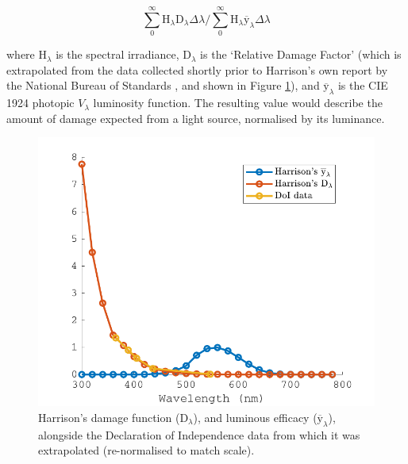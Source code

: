 \begin{equation}
    \sum_{0}^{\infty} \mathrm{H}_{\lambda} \mathrm{D}_{\lambda} \Delta \lambda / \sum_{0}^{\infty} \mathrm{H}_{\lambda} \overline{\mathrm{y}}_{\lambda} \Delta \lambda
    \label{eq:Harrison}
\end{equation}

where $\mathrm{H}_{\lambda}$ is the spectral irradiance, $\mathrm{D}_{\lambda}$ is the `Relative Damage Factor' (which is extrapolated from the data collected shortly prior to Harrison's own report by the National Bureau of Standards \citep{national_bureau_of_standards_preservation_1951}, and shown in Figure \ref{fig:Harrison}), and $\overline{\mathrm{y}}_{\lambda}$ is the \gls{CIE} 1924 photopic $V_{\lambda}$ luminosity function. The resulting value would describe the amount of damage expected from a light source, normalised by its luminance.

\begin{figure}[htbp]
\includegraphics[max width=\textwidth]{figs/LitRev/HarrisonAndDoI.pdf}
\caption{Harrison's \citep{harrison_report_1953} damage function ($\mathrm{D}_{\lambda}$), and luminous efficacy ($\overline{\mathrm{y}}_{\lambda}$), alongside the Declaration of Independence data \citep{national_bureau_of_standards_preservation_1951} from which it was extrapolated (re-normalised to match scale).}
\label{fig:Harrison}
\end{figure}



